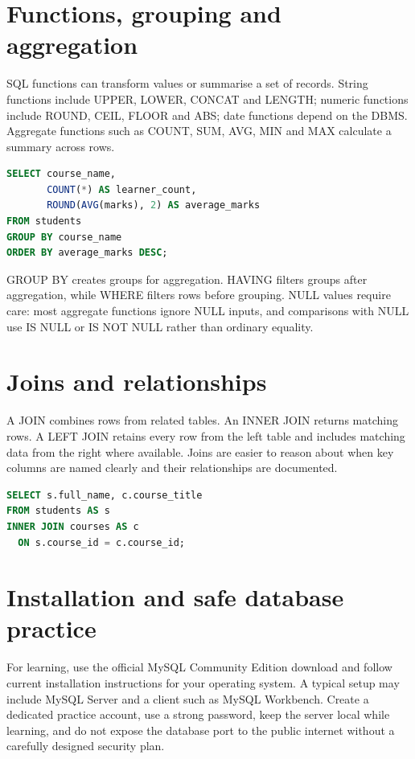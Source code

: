 \documentclass[11pt,openany,oneside]{book}
\begin{document}
\section{Functions, grouping and aggregation}
SQL functions can transform values or summarise a set of records. String functions include UPPER, LOWER, CONCAT and LENGTH; numeric functions include ROUND, CEIL, FLOOR and ABS; date functions depend on the DBMS. Aggregate functions such as COUNT, SUM, AVG, MIN and MAX calculate a summary across rows.

\begin{lstlisting}[style=webcode,language=SQL]
SELECT course_name,
       COUNT(*) AS learner_count,
       ROUND(AVG(marks), 2) AS average_marks
FROM students
GROUP BY course_name
ORDER BY average_marks DESC;
\end{lstlisting}
GROUP BY creates groups for aggregation. HAVING filters groups after aggregation, while WHERE filters rows before grouping. NULL values require care: most aggregate functions ignore NULL inputs, and comparisons with NULL use IS NULL or IS NOT NULL rather than ordinary equality.

\section{Joins and relationships}
A JOIN combines rows from related tables. An INNER JOIN returns matching rows. A LEFT JOIN retains every row from the left table and includes matching data from the right where available. Joins are easier to reason about when key columns are named clearly and their relationships are documented.

\begin{lstlisting}[style=webcode,language=SQL]
SELECT s.full_name, c.course_title
FROM students AS s
INNER JOIN courses AS c
  ON s.course_id = c.course_id;
\end{lstlisting}

\section{Installation and safe database practice}
For learning, use the official MySQL Community Edition download and follow current installation instructions for your operating system. A typical setup may include MySQL Server and a client such as MySQL Workbench. Create a dedicated practice account, use a strong password, keep the server local while learning, and do not expose the database port to the public internet without a carefully designed security plan.
\end{document}

